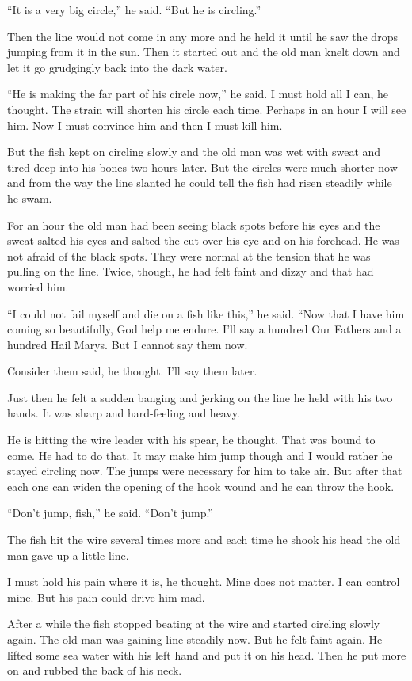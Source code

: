 \documentclass[fontset=ubuntu,zihao=-4]{ctexrep}
\newlength{\drop}%
\begin{document}
``It is a very big circle,'' he said. ``But he is circling.''

Then the line would not come in any more and he held it until he saw the
drops jumping from it in the sun. Then it started out and the old man \gls{knelt}
down and let it go \gls{grudgingly} back into the dark water.

``He is making the far part of his circle now,'' he said. I must hold all I
can, he thought. The strain will shorten his circle each time. Perhaps in an
hour I will see him. Now I must convince him and then I must kill him.

But the fish kept on circling slowly and the old man was wet with sweat and
tired deep into his bones two hours later. But the circles were much shorter
now and from the way the line slanted he could tell the fish had risen
steadily while he swam.

For an hour the old man had been seeing black spots before his eyes and the
sweat salted his eyes and salted the cut over his eye and on his forehead.
He was not afraid of the black spots. They were normal at the tension that
he was pulling on the line. Twice, though, he had felt faint and \gls{dizzy}
and that had worried him.

``I could not fail myself and die on a fish like this,'' he said. ``Now that
I have him coming so beautifully, God help me endure. I'll say a hundred Our
Fathers and a hundred Hail Marys. But I cannot say them now.

Consider them said, he thought. I'll say them later.

Just then he felt a sudden banging and jerking on the line he held with his
two hands. It was sharp and \gls{hard-feeling} and heavy.

He is hitting the wire leader with his \gls{spear}, he thought. That was
\gls{bound} to come. He had to do that. It may make him jump though and I
would rather he stayed circling now. The jumps were necessary for him to
take air. But after that each one can widen the opening of the hook \gls{wound}
and he can throw the hook.

``Don't jump, fish,'' he said. ``Don't jump.''

The fish hit the wire several times more and each time he \gls{shook} his
head the old man gave up a little line.

I must hold his pain where it is, he thought. Mine does not matter. I can
control mine. But his pain could drive him mad.

After a while the fish stopped beating at the wire and started circling
slowly again. The old man was gaining line steadily now. But he felt faint
again. He lifted some sea water with his left hand and put it on his head.
Then he put more on and rubbed the back of his neck.
\end{document}
